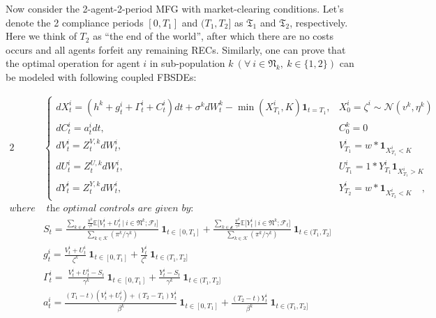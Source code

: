 \documentclass{article}
\begin{document}
Now consider the 2-agent-2-period MFG with market-clearing conditions.
Let's denote the 2 compliance periods \([0,T_1]\) and \((T_1,T_2]\) as
\(\mathfrak{T_1}\) and \(\mathfrak{T_2}\), respectively. Here we think
of \(T_2\) as ``the end of the world'', after which there are no costs
occurs and all agents forfeit any remaining RECs. Similarly, one can
prove that the optimal operation for agent \(i\) in sub-population
\(k~(\forall~i \in \mathfrak{N}_k,~k\in\lbrace{1,2\rbrace})\) can be
modeled with following coupled FBSDEs:

\begin{alignat}{2}
    &\begin{cases}
        dX_t^{i} =(h^{k}+g_t^{i}+\Gamma_t^{i}+C_t^{i})dt + \sigma^{k}dW_t^{k} - \min\left(X_{T_1}^i,K\right)\mathbf{1}_{t=T_1},  &X_0^{i} = \zeta^{i} \sim \mathcal{N}(v^k,\eta^k)\\
        dC_t^{i} = a_t^{i}dt ,  &C_0^{k}=0 \\ 
        dV_t^{i} = Z_t^{V,k}dW_t^{i},  &V_{T_1}^{i}=w*\mathbf{1}_{X^i_{T_1}<K} \\
        dU_t^{i} = Z_t^{U,k}dW_t^{i},  &U_{T_1}^{i}=1*Y_{T_1}^i\mathbf{1}_{X^i_{T_1}>K}\\
        dY_t^{i} = Z_t^{Y,k}dW_t^{i},  &Y_{T_2}^{i}=w*\mathbf{1}_{X^i_{T_2}<K}\quad,
    \end{cases} \\
    \textit{where} &\textit{ the optimal controls are given by:}\\
    & S_t = \frac{\sum\limits_{k \in \mathcal{k}} {\frac{\pi^k}{\gamma^k}\mathbb{E}\big[ V_t^i +U_t^i ~|~ i \in \mathfrak{N}^k; \mathcal{F}_t \big]}}{\sum\limits_{k \in \mathcal{K}}{(\pi^k/\gamma^k)}} 
            ~\mathbf{1}_{t\in [0,T_1]} +
            \frac{\sum\limits_{k \in \mathcal{k}} {\frac{\pi^k}{\gamma^k}\mathbb{E}\big[ Y_t^i ~|~ i \in \mathfrak{N}^k; \mathcal{F}_t \big]}}{\sum\limits_{k \in \mathcal{K}}{(\pi^k/\gamma^k)}} 
            ~\mathbf{1}_{t\in (T_1,T_2]} \\
    & g_t^{i} = \frac{V_t^{i}+U_t^{i}}{\zeta^{k}} ~\mathbf{1}_{t\in [0,T_1]}
                + \frac{Y_t^{i}}{\zeta^{k}} ~\mathbf{1}_{t\in (T_1,T_2]} \\
    & \Gamma_t^{i} =\  \frac{V_t^{i}+U_t^{i}-S_t}{\gamma^{k}} ~\mathbf{1}_{t\in [0,T_1]}
                    + \frac{Y_t^{i}-S_t}{\gamma^{k}} ~\mathbf{1}_{t\in (T_1,T_2]} \\
    & a_t^{i} =\frac{(T_1-t)(V_t^{i}+U_t^{i})+(T_2-T_1)Y^i_t}{\beta^{k}} ~\mathbf{1}_{t\in [0,T_1]}
                + \frac{(T_2-t)Y_t^{i}}{\beta^{k}} ~\mathbf{1}_{t\in (T_1,T_2]} \\
\end{alignat}
\end{document}
